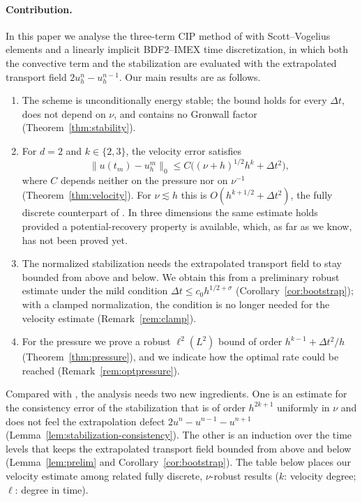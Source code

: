 \documentclass[11pt]{article}
\theoremstyle{remark}\newtheorem{remark}{Remark}
\theoremstyle{plain}
\begin{document}
{\paragraph{Contribution.} In this paper we analyse the three-term CIP method of \cite{BBCG24,GAN25} with Scott--Vogelius elements and a linearly implicit BDF2--IMEX time discretization, in which both the convective term and the stabilization are evaluated with the extrapolated transport field $2u_h^n-u_h^{n-1}$. Our main results are as follows.
\begin{enumerate}[label=(\roman*),itemsep=2pt]
\item The scheme is unconditionally energy stable; the bound holds for every $\Delta t$, does not depend on $\nu$, and contains no Gronwall factor (Theorem~\ref{thm:stability}).
\item For $d=2$ and $k\in\{2,3\}$, the velocity error satisfies
\[
\|u(t_m)-u_h^m\|_0\le C\big((\nu+h)^{1/2}h^k+\Delta t^2\big),
\]
where $C$ depends neither on the pressure nor on $\nu^{-1}$ (Theorem~\ref{thm:velocity}). For $\nu\lesssim h$ this is $O(h^{k+1/2}+\Delta t^2)$, the fully discrete counterpart of \cite[Thm.~3.7]{GAN25}. In three dimensions the same estimate holds provided a potential-recovery property is available, which, as far as we know, has not been proved yet.
\item The normalized stabilization needs the extrapolated transport field to stay bounded from above and below. We obtain this from a preliminary robust estimate under the mild condition $\Delta t\le c_0h^{1/2+\sigma}$ (Corollary~\ref{cor:bootstrap}); with a clamped normalization, the condition is no longer needed for the velocity estimate (Remark~\ref{rem:clamp}).
\item For the pressure we prove a robust $\ell^2(L^2)$ bound of order $h^{k-1}+\Delta t^2/h$ (Theorem~\ref{thm:pressure}), and we indicate how the optimal rate could be reached (Remark~\ref{rem:optpressure}).
\end{enumerate}
Compared with \cite{GAN25}, the analysis needs two new ingredients. One is an estimate for the consistency error of the stabilization that is of order $h^{2k+1}$ uniformly in $\nu$ and does not feel the extrapolation defect $2u^n-u^{n-1}-u^{n+1}$ (Lemma~\ref{lem:stabilization-consistency}). The other is an induction over the time levels that keeps the extrapolated transport field bounded from above and below (Lemma~\ref{lem:prelim} and Corollary~\ref{cor:bootstrap}). The table below places our velocity estimate among related fully discrete, $\nu$-robust results ($k$: velocity degree; $\ell$: degree in time).
}
\end{document}
